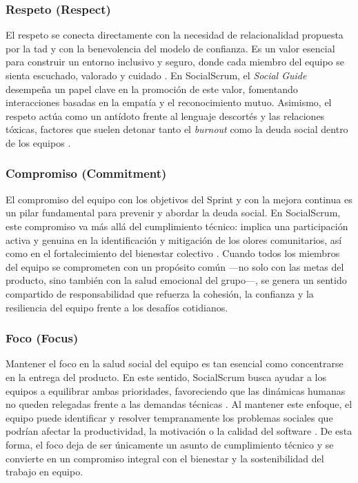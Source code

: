\subsubsection{Respeto (Respect)}
El respeto se conecta directamente con la necesidad de relacionalidad propuesta por la \acrfull{tad} y con la benevolencia del modelo de confianza.
Es un valor esencial para construir un entorno inclusivo y seguro, donde cada miembro del equipo se sienta escuchado, valorado y cuidado \cite{ryan_self-determination_2000}.
En SocialScrum, el \textit{Social Guide} desempeña un papel clave en la promoción de este valor, fomentando interacciones basadas en la empatía y el reconocimiento mutuo.
Asimismo, el respeto actúa como un antídoto frente al lenguaje descortés y las relaciones tóxicas, factores que suelen detonar tanto el \textit{burnout} como la deuda social dentro de los equipos \cite{tulili2022burnout}.

\subsubsection{Compromiso (Commitment)}
El compromiso del equipo con los objetivos del Sprint y con la mejora continua es un pilar fundamental para prevenir y abordar la deuda social.
En SocialScrum, este compromiso va más allá del cumplimiento técnico: implica una participación activa y genuina en la identificación y mitigación de los olores comunitarios, así como en el fortalecimiento del bienestar colectivo \cite{caballero2022communitysmells}.
Cuando todos los miembros del equipo se comprometen con un propósito común —no solo con las metas del producto, sino también con la salud emocional del grupo—, se genera un sentido compartido de responsabilidad que refuerza la cohesión, la confianza y la resiliencia del equipo frente a los desafíos cotidianos.

\subsubsection{Foco (Focus)}
Mantener el foco en la salud social del equipo es tan esencial como concentrarse en la entrega del producto.
En este sentido, SocialScrum busca ayudar a los equipos a equilibrar ambas prioridades, favoreciendo que las dinámicas humanas no queden relegadas frente a las demandas técnicas \cite{saeeda2024nontechnicaldebt}.
Al mantener este enfoque, el equipo puede identificar y resolver tempranamente los problemas sociales que podrían afectar la productividad, la motivación o la calidad del software \cite{saeeda2024nontechnicaldebt}.
De esta forma, el foco deja de ser únicamente un asunto de cumplimiento técnico y se convierte en un compromiso integral con el bienestar y la sostenibilidad del trabajo en equipo.

